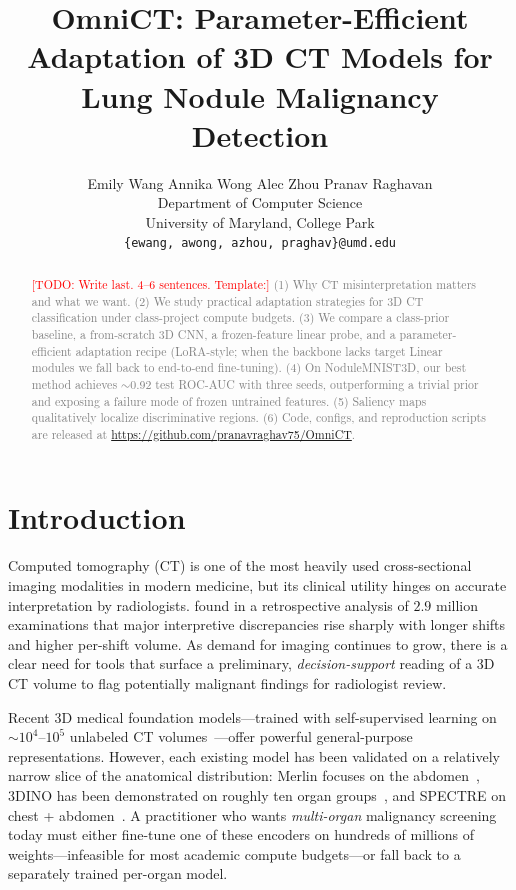 \documentclass{article}
\title{OmniCT: Parameter-Efficient Adaptation of {3D} CT Models for
  Lung Nodule Malignancy Detection}
\author{%
  Emily Wang \quad Annika Wong \quad Alec Zhou \quad Pranav Raghavan \\
  Department of Computer Science \\
  University of Maryland, College Park \\
  \texttt{\{ewang, awong, azhou, praghav\}@umd.edu} \\
}
\newcommand{\TODO}[1]{\textcolor{red}{[TODO: #1]}}
\newcommand{\PLACE}[1]{\textcolor{gray}{#1}}
\begin{document}
\maketitle

\begin{abstract}
\TODO{Write last. 4--6 sentences. Template:}
\PLACE{(1) Why CT misinterpretation matters and what we want.
(2) We study practical adaptation strategies for 3D CT classification under
class-project compute budgets.
(3) We compare a class-prior baseline, a from-scratch 3D CNN, a frozen-feature
linear probe, and a parameter-efficient adaptation recipe (LoRA-style; when the
backbone lacks target Linear modules we fall back to end-to-end fine-tuning).
(4) On NoduleMNIST3D, our best method achieves $\sim$0.92 test ROC-AUC with three
seeds, outperforming a trivial prior and exposing a failure mode of frozen
untrained features.
(5) Saliency maps qualitatively localize discriminative regions.
(6) Code, configs, and reproduction scripts are released at
\url{https://github.com/pranavraghav75/OmniCT}.}
\end{abstract}

\section{Introduction}

Computed tomography (CT) is one of the most heavily used cross-sectional
imaging modalities in modern medicine, but its clinical utility hinges
on accurate interpretation by radiologists. \citet{hanna2018_radiology_error}
found in a retrospective analysis of $2.9$ million examinations that
major interpretive discrepancies rise sharply with longer shifts and
higher per-shift volume. As demand for imaging continues to grow,
there is a clear need for tools that surface a preliminary,
\emph{decision-support} reading of a 3D CT volume to flag potentially
malignant findings for radiologist review.

Recent 3D medical foundation models---trained with self-supervised
learning on $\sim 10^{4}$--$10^{5}$ unlabeled CT
volumes~\citep{xu2025_3dino,claessens2025_spectre,blankemeier2026_merlin,hayes2025_curia}---offer
powerful general-purpose representations.
However, each existing model has been validated on a relatively narrow
slice of the anatomical distribution: Merlin focuses on the
abdomen~\citep{blankemeier2026_merlin}, 3DINO has been demonstrated on
roughly ten organ groups~\citep{xu2025_3dino}, and SPECTRE on chest +
abdomen~\citep{claessens2025_spectre}.
A practitioner who wants \emph{multi-organ} malignancy screening today
must either fine-tune one of these encoders on hundreds of millions of
weights---infeasible for most academic compute budgets---or fall back to
a separately trained per-organ model.
\end{document}

